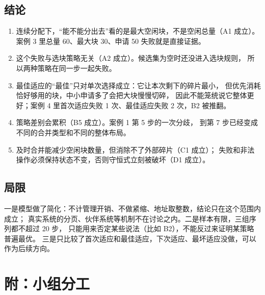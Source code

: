 \documentclass[12pt,a4paper]{ctexart}
\begin{document}
\subsection{结论}

\begin{enumerate}
    \item 连续分配下，“能不能分出去”看的是最大空闲块，不是空闲总量（A1 成立）。
          案例 3 里总量 60、最大块 30、申请 50 失败就是直接证据。
    \item 这个失败与选块策略无关（A2 成立）。候选集为空时还没进入选块规则，
          所以两种策略在同一步一起失败。
    \item 最佳适应的“最佳”只对单次选择成立：它让本次剩下的碎片最小，
          但优先消耗恰好够用的块，中小申请多了会把大块慢慢切碎，
          因此不能笼统说它整体更好；案例 4 里首次适应失败 1 次、最佳适应失败 2 次，B2 被推翻。
    \item 策略差别会累积（B5 成立）。案例 1 第 5 步的一次分歧，
          到第 7 步已经变成不同的合并类型和不同的整体布局。
    \item 及时合并能减少空闲块数量，但消除不了外部碎片（C1 成立）；
          失败和非法操作必须保持状态不变，否则守恒式立刻被破坏（D1 成立）。
\end{enumerate}

\subsection{局限}

一是模型做了简化：不计管理开销、不做紧缩、地址取整数，结论只在这个范围内成立；
真实系统的分页、伙伴系统等机制不在讨论之内。二是样本有限，三组序列都不超过 20 步，
只能用来否定某些说法（比如 B2），不能反过来证明某策略普遍最优。
三是只比较了首次适应和最佳适应，下次适应、最坏适应没做，可以作为后续方向。

\clearpage
\section*{附：小组分工}
\end{document}
